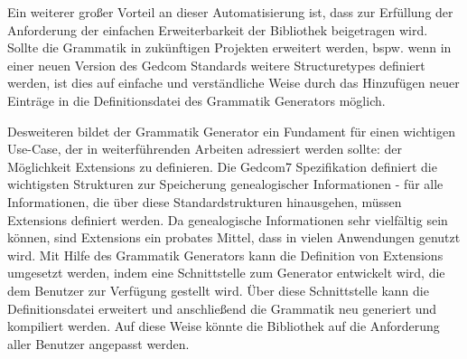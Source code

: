 Ein weiterer großer Vorteil an dieser Automatisierung ist, dass zur Erfüllung der Anforderung der einfachen Erweiterbarkeit der Bibliothek beigetragen wird. Sollte die Grammatik in zukünftigen Projekten erweitert werden, bspw. wenn in einer neuen Version des Gedcom Standards weitere Structuretypes definiert werden, ist dies auf einfache und verständliche Weise durch das Hinzufügen neuer Einträge in die Definitionsdatei des Grammatik Generators möglich. 


Desweiteren bildet der Grammatik Generator ein Fundament für einen wichtigen Use-Case, der in weiterführenden Arbeiten adressiert werden sollte: der Möglichkeit Extensions zu definieren. Die Gedcom7 Spezifikation definiert die wichtigsten Strukturen zur Speicherung genealogischer Informationen - für alle Informationen, die über diese Standardstrukturen hinausgehen, müssen Extensions definiert werden. Da genealogische Informationen sehr vielfältig sein können, sind Extensions ein probates Mittel, dass in vielen Anwendungen genutzt wird. Mit Hilfe des Grammatik Generators kann die Definition von Extensions umgesetzt werden, indem eine Schnittstelle zum Generator entwickelt wird, die dem Benutzer zur Verfügung gestellt wird. Über diese Schnittstelle kann die Definitionsdatei erweitert und anschließend die Grammatik neu generiert und kompiliert werden. Auf diese Weise könnte die Bibliothek auf die Anforderung aller Benutzer angepasst werden. 

